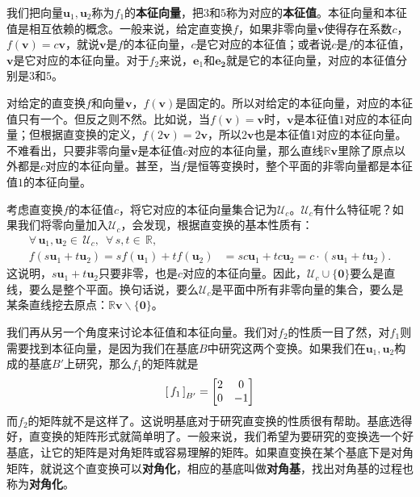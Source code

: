 \documentclass[12pt,UTF8]{ctexbook}
\begin{document}
我们把向量$\mathbf{u}_1,\mathbf{u}_2$称为$f_1$的\textbf{本征向量}，把$3$和$5$称为对应的\textbf{本征值}。本征向量和本征值是相互依赖的概念。一般来说，给定直变换$f$，如果非零向量$\mathbf{v}$使得存在系数$c$，$f(\mathbf{v}) = c\mathbf{v}$，就说$\mathbf{v}$是$f$的本征向量，$c$是它对应的本征值；或者说$c$是$f$的本征值，$\mathbf{v}$是它对应的本征向量。对于$f_2$来说，$\mathbf{e}_1$和$\mathbf{e_2}$就是它的本征向量，对应的本征值分别是$3$和$5$。

对给定的直变换$f$和向量$\mathbf{v}$，$f(\mathbf{v})$是固定的。所以对给定的本征向量，对应的本征值只有一个。但反之则不然。比如说，当$f(\mathbf{v}) = \mathbf{v}$时，$\mathbf{v}$是本征值$1$对应的本征向量；但根据直变换的定义，$f(2\mathbf{v}) = 2\mathbf{v}$，所以$2\mathbf{v}$也是本征值$1$对应的本征向量。不难看出，只要非零向量$\mathbf{v}$是本征值$c$对应的本征向量，那么直线$\mathbb{R}\mathbf{v}$里除了原点以外都是$c$对应的本征向量。甚至，当$f$是恒等变换时，整个平面的非零向量都是本征值$1$的本征向量。

考虑直变换$f$的本征值$c$，将它对应的本征向量集合记为$\mathcal{U}_c$。$\mathcal{U}_c$有什么特征呢？如果我们将零向量加入$\mathcal{U}_c$，会发现，根据直变换的基本性质有：
\begin{align*}
\forall\,\mathbf{u}_1,\mathbf{u}_2\in\,\mathcal{U}_c,\,\,\,\forall \,s, t\in\,\mathbb{R},\qquad\qquad\\
 f(s\mathbf{u}_1+t\mathbf{u}_2) = sf(\mathbf{u}_1)+tf(\mathbf{u}_2) &= sc\mathbf{u}_1 + tc\mathbf{u}_2 = c\cdot(s\mathbf{u}_1+t\mathbf{u}_2).
\end{align*}
这说明，$s\mathbf{u}_1+t\mathbf{u}_2$只要非零，也是$c$对应的本征向量。因此，$\mathcal{U}_c\cup\{\mathbf{0}\}$要么是直线，要么是整个平面。换句话说，要么$\mathcal{U}_c$是平面中所有非零向量的集合，要么是某条直线挖去原点：$\mathbb{R}\mathbf{v}\backslash \{\mathbf{0}\}$。

我们再从另一个角度来讨论本征值和本征向量。我们对$f_2$的性质一目了然，对$f_1$则需要找到本征向量，是因为我们在基底$B$中研究这两个变换。如果我们在$\mathbf{u}_1,\mathbf{u}_2$构成的基底$B'$上研究，那么$f_1$的矩阵就是
$$
\bmat{f_1}[B'] = 
\begin{bmatrix}
    2 & 0  \\ 0 & -1
\end{bmatrix}
$$
而$f_2$的矩阵就不是这样了。这说明基底对于研究直变换的性质很有帮助。基底选得好，直变换的矩阵形式就简单明了。一般来说，我们希望为要研究的变换选一个好基底，让它的矩阵是对角矩阵或容易理解的矩阵。如果直变换在某个基底下是对角矩阵，就说这个直变换可以\textbf{对角化}，相应的基底叫做\textbf{对角基}，找出对角基的过程也称为\textbf{对角化}。
\end{document}
